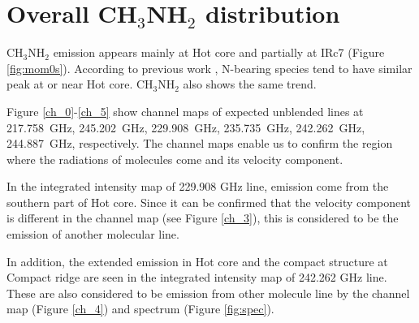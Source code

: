 \newpage
\section{Overall CH$_3$NH$_2$ distribution}
CH$_3$NH$_2$ emission appears mainly at Hot core and partially at IRc7 (Figure \ref{fig:mom0s}).
According to previous work \citep[see e.g.,][]{Feng+2015, Gong+2015}, N-bearing species tend to have 
similar peak at or near Hot core.  CH$_3$NH$_2$ also shows the same trend.

Figure \ref{ch_0}-\ref{ch_5} show channel maps of expected unblended lines at 217.758~GHz, 
245.202~GHz, 229.908~GHz, 235.735~GHz, 242.262~GHz, 244.887~GHz, respectively.
The channel maps enable us to confirm the region where the radiations of molecules come and its velocity component.

In the integrated intensity map of 229.908 GHz line, emission come from the southern part of Hot core.
Since it can be confirmed that the velocity component is different in the channel map (see Figure \ref{ch_3}), 
this is considered to be the emission of another molecular line.

In addition, the extended emission in Hot core and the compact structure at Compact ridge are seen 
in the integrated intensity map of 242.262 GHz line. These are also considered to be emission from other molecule line 
by the channel map (Figure \ref{ch_4}) and spectrum (Figure \ref{fig:spec}).

